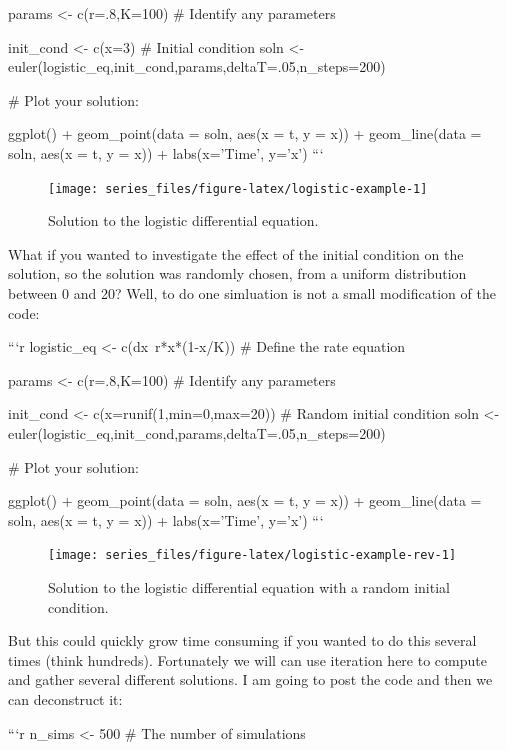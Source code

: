 \documentclass[
]{book}
\theoremstyle{definition}
\theoremstyle{definition}
\theoremstyle{definition}
\theoremstyle{remark}
\begin{document}
params <- c(r=.8,K=100)  # Identify any parameters

init_cond <- c(x=3)  # Initial condition
soln <- euler(logistic_eq,init_cond,params,deltaT=.05,n_steps=200)

# Plot your solution:

ggplot() + 
  geom_point(data = soln, aes(x = t, y = x)) +
  geom_line(data = soln, aes(x = t, y = x)) +
  labs(x='Time',
         y='x')
```

\begin{figure}

{\centering \texttt{[image: series\_files/figure-latex/logistic-example-1]} 

}

\caption{Solution to the logistic differential equation.}\label{fig:logistic-example}
\end{figure}

What if you wanted to investigate the effect of the initial condition on the solution, so the solution was randomly chosen, from a uniform distribution between 0 and 20? Well, to do one simluation is not a small modification of the code:


```r
logistic_eq <- c(dx~r*x*(1-x/K))  # Define the rate equation

params <- c(r=.8,K=100)  # Identify any parameters

init_cond <- c(x=runif(1,min=0,max=20))  # Random initial condition
soln <- euler(logistic_eq,init_cond,params,deltaT=.05,n_steps=200)

# Plot your solution:

ggplot() + 
  geom_point(data = soln, aes(x = t, y = x)) +
  geom_line(data = soln, aes(x = t, y = x)) +
  labs(x='Time',
         y='x')
```

\begin{figure}

{\centering \texttt{[image: series\_files/figure-latex/logistic-example-rev-1]} 

}

\caption{Solution to the logistic differential equation with a random initial condition.}\label{fig:logistic-example-rev}
\end{figure}

But this could quickly grow time consuming if you wanted to do this several times (think hundreds). Fortunately we will can use iteration here to compute and gather several different solutions. I am going to post the code and then we can deconstruct it:


```r
n_sims <- 500  # The number of simulations
\end{document}
